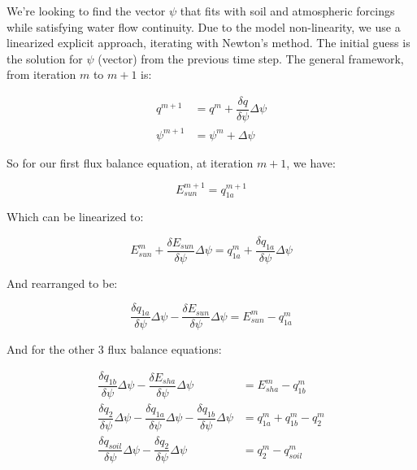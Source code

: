 \documentclass[draft,linenumbers]{agujournal}
\begin{document}
We're looking to find the vector $\psi$
that fits with soil and atmospheric forcings while satisfying water flow continuity. 
Due to the model non-linearity, we use a linearized explicit approach, iterating with Newton's method. 
The initial guess is the solution for $\psi$ (vector) from the previous time step. 
The general framework, from iteration $m$ to $m+1$ is:

   \begin{linenomath*} \begin{equation} 
   \begin{aligned}
   q^{m+1}&=q^m+\dfrac{\delta q}{\delta\psi}\Delta\psi \\
   \psi^{m+1}&=\psi^{m}+\Delta\psi
   \end{aligned}
   \end{equation} \end{linenomath*}

So for our first flux balance equation, at iteration $m+1$, we have:

   \begin{linenomath*} \begin{equation} 
   E_{sun}^{m+1}=q_{1a}^{m+1}
   \end{equation} \end{linenomath*}

Which can be linearized to:

   \begin{linenomath*} \begin{equation} 
   E_{sun}^{m}+\dfrac{\delta E_{sun}}{\delta\psi}\Delta\psi=q_{1a}^{m}+\dfrac{\delta q_{1a}}{\delta\psi}\Delta\psi
   \end{equation} \end{linenomath*}

And rearranged to be:

   \begin{linenomath*} \begin{equation} 
   \dfrac{\delta q_{1a}}{\delta\psi}\Delta\psi-\dfrac{\delta E_{sun}}{\delta\psi}\Delta\psi=E_{sun}^{m}-q_{1a}^{m}
   \end{equation} \end{linenomath*}

And for the other 3 flux balance equations:

   \begin{linenomath*} \begin{equation} 
   \begin{aligned}
   \dfrac{\delta q_{1b}}{\delta\psi}\Delta\psi-\dfrac{\delta E_{sha}}{\delta\psi}\Delta\psi&=E_{sha}^{m}-q_{1b}^{m} \\
   \dfrac{\delta q_2}{\delta\psi}\Delta\psi-\dfrac{\delta q_{1a}}{\delta\psi}\Delta\psi-\dfrac{\delta q_{1b}}{\delta\psi}\Delta\psi&=q_{1a}^{m}+q_{1b}^{m}-q_2^{m} \\
   \dfrac{\delta q_{soil}}{\delta\psi}\Delta\psi-\dfrac{\delta q_2}{\delta\psi}\Delta\psi&=q_2^{m}-q_{soil}^{m}
   \end{aligned}
   \end{equation} \end{linenomath*}
\end{document}
